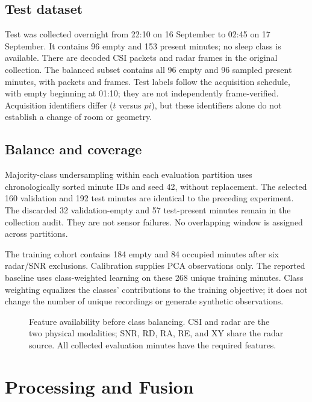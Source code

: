 \documentclass[conference,10pt,letterpaper]{IEEEtran}
\begin{document}
\subsection{Test dataset}
Test was collected overnight from 22:10 on 16 September to 02:45 on 17 September. It contains 96 empty and 153 present minutes; no sleep class is available. There are \TestPackets{} decoded CSI packets and \TestFrames{} radar frames in the original collection. The balanced subset contains all 96 empty and 96 sampled present minutes, with \TestSelectedPackets{} packets and \TestSelectedFrames{} frames. Test labels follow the acquisition schedule, with empty beginning at 01:10; they are not independently frame-verified. Acquisition identifiers differ ($t$ versus $pi$), but these identifiers alone do not establish a change of room or geometry.

\subsection{Balance and coverage}
Majority-class undersampling within each evaluation partition uses chronologically sorted minute IDs and seed 42, without replacement. The selected 160 validation and 192 test minutes are identical to the preceding experiment. The discarded 32 validation-empty and 57 test-present minutes remain in the collection audit. They are not sensor failures. No overlapping window is assigned across partitions.

The training cohort contains 184 empty and 84 occupied minutes after six radar/SNR exclusions. Calibration supplies PCA observations only. The reported baseline uses class-weighted learning on these 268 unique training minutes. Class weighting equalizes the classes' contributions to the training objective; it does not change the number of unique recordings or generate synthetic observations.

\begin{figure}[t]
\centering
\caption{Feature availability before class balancing. CSI and radar are the two physical modalities; SNR, RD, RA, RE, and XY share the radar source. All collected evaluation minutes have the required features.}
\label{fig:coverage}
\end{figure}

\section{Processing and Fusion}\label{sec:processing}
\end{document}
